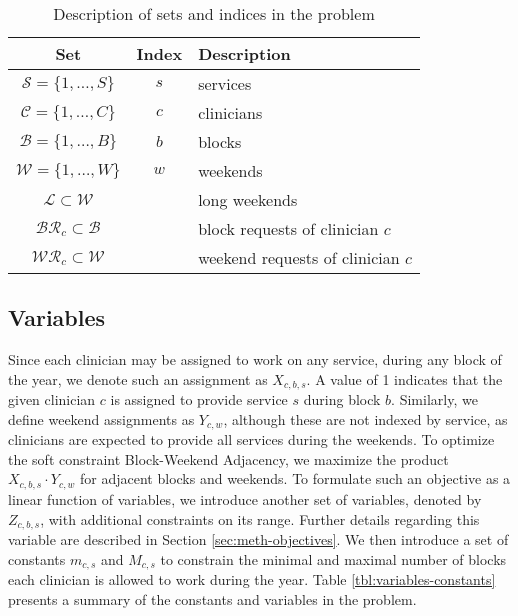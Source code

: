 \begin{table}[h]
	\centering
	\begin{tabular}{ c c l }
		\hline
		\textbf{Set}                         & \textbf{Index} & \textbf{Description}              \\ \hline
		$\mathcal{S} = \{1, \ldots, S \}$    & $s$            & services                          \\
		$\mathcal{C} = \{1, \ldots, C \}$    & $c$            & clinicians                        \\
		$\mathcal{B} = \{1, \ldots, B \}$    & $b$            & blocks                            \\
		$\mathcal{W} = \{1, \ldots, W \}$    & $w$            & weekends                          \\
		$\mathcal{L} \subset \mathcal{W}$    &                & long weekends                     \\
		$\mathcal{BR}_c \subset \mathcal{B}$ &                & block requests of clinician $c$   \\
		$\mathcal{WR}_c \subset \mathcal{W}$ &                & weekend requests of clinician $c$
	\end{tabular}
	\caption{Description of sets and indices in the problem}
	\label{tbl:sets-indices}
\end{table}

\subsection{Variables} \label{sec:meth-variables}
Since each clinician may be assigned to work on any service, during any block of the year, we denote such an assignment as $X_{c, b, s}$. A value of 1 indicates that the given clinician $c$ is assigned to provide service $s$ during block $b$. Similarly, we define weekend assignments as $Y_{c, w}$, although these are not indexed by service, as clinicians are expected to provide all services during the weekends. To optimize the soft constraint Block-Weekend Adjacency, we maximize the product $X_{c, b, s} \cdot Y_{c, w}$ for adjacent blocks and weekends. To formulate such an objective as a linear function of variables, we introduce another set of variables, denoted by $Z_{c, b, s}$, with additional constraints on its range. Further details regarding this variable are described in Section \ref{sec:meth-objectives}. We then introduce a set of constants $m_{c, s}$ and $M_{c, s}$ to constrain the minimal and maximal number of blocks each clinician is allowed to work during the year. Table \ref{tbl:variables-constants} presents a summary of the constants and variables in the problem.

